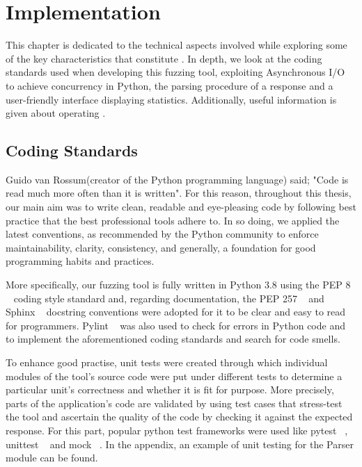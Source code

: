 \chapter{Implementation}
\label{sec:implementation}
\minitoc
\vspace*{1cm}

This chapter is dedicated to the technical aspects involved while exploring some of the key characteristics that constitute \pname{}. In depth, we look at the coding standards used when developing this fuzzing tool, exploiting Asynchronous I/O to achieve concurrency in Python, the parsing procedure of a response and a user-friendly interface displaying statistics. Additionally, useful information is given about operating \pname{}.

\section{Coding Standards}
Guido van Rossum(creator of the Python programming language) said; "Code is read much more often than it is written". For this reason, throughout this thesis, our main aim was to write clean, readable and eye-pleasing code by following best practice that the best professional tools adhere to. In so doing, we applied the latest conventions, as recommended by the Python community to enforce maintainability, clarity, consistency, and generally, a foundation for good programming habits and practices. 

More specifically, our fuzzing tool is fully written in Python 3.8 using the PEP 8 ~\cite{python_pep8} coding style standard and, regarding documentation, the PEP 257 ~\cite{python_pep257} and Sphinx ~\cite{sphinx} docstring conventions were adopted for it to be clear and easy to read for programmers. Pylint ~\cite{pylint_module} was also used to check for errors in Python code and to implement the aforementioned coding standards and search for code smells.

To enhance good practise, unit tests were created through which individual modules of the tool's source code were put under different tests to determine a particular unit's correctness and whether it is fit for purpose. More precisely, parts of the application's code are validated by using test cases that stress-test the tool and ascertain the quality of the code by checking it against the expected response. For this part, popular python test frameworks were used like pytest ~\cite{pytest_module}, unittest ~\cite{unittest_module} and mock ~\cite{mock}. In the appendix, an example of unit testing for the Parser module can be found.

